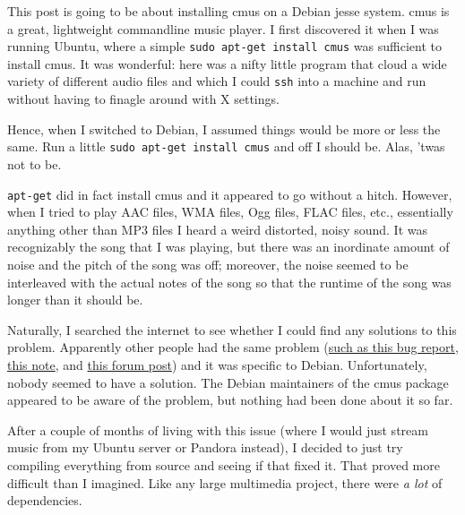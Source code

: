 \documentclass[12pt]{article}
\begin{document}
This post is going to be about installing cmus on a Debian jesse system.
cmus is a great, lightweight commandline music player.
I first discovered it when I was running Ubuntu, where a simple \lstinline$sudo apt-get install cmus$ was sufficient to install cmus.
It was wonderful: here was a nifty little program that cloud a wide variety of different audio files and which I could \lstinline$ssh$ into a machine and run without having to finagle around with X settings.

Hence, when I switched to Debian, I assumed things would be more or less the same. 
Run a little \lstinline$sudo apt-get install cmus$ and off I should be.
Alas, 'twas not to be.

\lstinline$apt-get$ did in fact install cmus and it appeared to go without a hitch.
However, when I tried to play AAC files, WMA files, Ogg files, FLAC files, etc., essentially anything other than MP3 files I heard a weird distorted, noisy sound.
It was recognizably the song that I was playing, but there was an inordinate amount of noise and the pitch of the song was off;
moreover, the noise seemed to be interleaved with the actual notes of the song so that the runtime of the song was longer than it should be.

Naturally, I searched the internet to see whether I could find any solutions to this problem.
Apparently other people had the same problem (\href{https://bugs.debian.org/cgi-bin/bugreport.cgi?bug=728202}{such as this bug report}, \href{http://lists.alioth.debian.org/pipermail/pkg-multimedia-maintainers/2013-November/035237.html}{this note}, and \href{http://crunchbang.org/forums/viewtopic.php?id=31116}{this forum post}) and it was specific to Debian.
Unfortunately, nobody seemed to have a solution.
The Debian maintainers of the cmus package appeared to be aware of the problem, but nothing had been done about it so far.

After a couple of months of living with this issue (where I would just stream music from my Ubuntu server or Pandora instead), I decided to just try compiling everything from source and seeing if that fixed it.
That proved more difficult than I imagined.
Like any large multimedia project, there were \emph{a lot} of dependencies.
\end{document}
